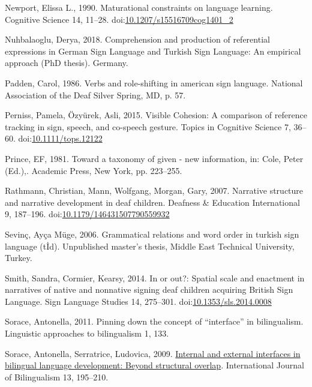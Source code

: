 \documentclass[]{elsarticle} %
\newlength{\cslhangindent}
\newenvironment{CSLReferences}[2] %
 {%
  \setlength{\parindent}{0pt}
  \ifodd #1 \everypar{\setlength{\hangindent}{\cslhangindent}}\ignorespaces\fi
  \ifnum #2 > 0
  \setlength{\parskip}{#2\baselineskip}
  \fi
 }%
 {}
\begin{document}
\begin{CSLReferences}{1}{0}
\leavevmode{}%
Newport, Elissa L., 1990. Maturational constraints on language learning.
Cognitive Science 14, 11--28.
doi:\href{https://doi.org/10.1207/s15516709cog1401_2}{10.1207/s15516709cog1401\_2}

\leavevmode{}%
Nuhbalaoglu, Derya, 2018. Comprehension and production of referential
expressions in German Sign Language and Turkish Sign Language: An
empirical approach (PhD thesis). Germany.

\leavevmode{}%
Padden, Carol, 1986. Verbs and role-shifting in american sign language.
National Association of the Deaf Silver Spring, MD, p. 57.

\leavevmode{}%
Perniss, Pamela, Özyürek, Asli, 2015. Visible Cohesion: A comparison of
reference tracking in sign, speech, and co-speech gesture. Topics in
Cognitive Science 7, 36--60.
doi:\href{https://doi.org/10.1111/tops.12122}{10.1111/tops.12122}

\leavevmode{}%
Prince, EF, 1981. Toward a taxonomy of given - new information, in:
Cole, Peter (Ed.),. Academic Press, New York, pp. 223--255.

\leavevmode{}%
Rathmann, Christian, Mann, Wolfgang, Morgan, Gary, 2007. Narrative
structure and narrative development in deaf children. Deafness \&
Education International 9, 187--196.
doi:\href{https://doi.org/10.1179/146431507790559932}{10.1179/146431507790559932}

\leavevmode{}%
Sevinç, Ayça Müge, 2006. Grammatical relations and word order in turkish
sign language (t{İ}d). Unpublished master's thesis, Middle East
Technical University, Turkey.

\leavevmode{}%
Smith, Sandra, Cormier, Kearsy, 2014. In or out?: Spatial scale and
enactment in narratives of native and nonnative signing deaf children
acquiring British Sign Language. Sign Language Studies 14, 275--301.
doi:\href{https://doi.org/10.1353/sls.2014.0008}{10.1353/sls.2014.0008}

\leavevmode{}%
Sorace, Antonella, 2011. Pinning down the concept of {``}interface{''}
in bilingualism. Linguistic approaches to bilingualism 1, 133.

\leavevmode{}%
Sorace, Antonella, Serratrice, Ludovica, 2009.
\href{https://doi.org/10.1177/1367006909339810}{Internal and external
interfaces in bilingual language development: Beyond structural
overlap}. International Journal of Bilingualism 13, 195--210.


\end{CSLReferences}
\end{document}
